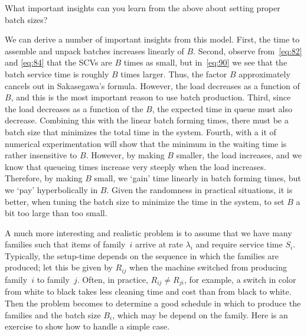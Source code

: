 \begin{exercise}
  What important insights can you learn from the above about setting proper batch sizes?
\begin{solution}
  We can derive a number of important insights from this model.
  First, the time to assemble and unpack batches increases linearly of $B$.
  Second, observe from~\cref{eq:82} and \cref{eq:84} that the SCVs are $B$ times as small, but in~\cref{eq:90} we see that the batch service time is roughly $B$ times larger.
  Thus, the factor $B$ approximately cancels out in Sakasegawa's formula.
  However, the load decreases as a function of $B$, and this is the most important reason to use batch production.
  Third, since the load decreases as a function of the $B$, the expected time in queue must also decrease.
  Combining this with the linear batch forming times, there must be a batch size that minimizes the total time in the system.
  Fourth, with a it of numerical experimentation will show that the minimum in the waiting time is rather insensitive to $B$.
  However, by making $B$ smaller, the load increases, and we know that queueing times increase very steeply when the load increases.
  Therefore, by making $B$ small, we `gain' time linearly in batch forming times, but we `pay' hyperbolically in $B$.
  Given the randomness in practical situations, it is better, when tuning the batch size to minimize the time in the system, to set $B$ a bit too large than too small.
\end{solution}
\end{exercise}

A much more interesting and realistic problem is to assume that we have many families such that items of family~$i$ arrive at rate $\lambda_i$ and require service time $S_i$.
Typically, the setup-time depends on the sequence in which the families are produced; let this be given by $R_{ij}$ when the machine switched from producing family~$i$ to family~$j$.
Often, in practice, $R_{ij} \neq R_{ji}$, for example, a switch in color from white to black takes less cleaning time and cost than from black to white.
Then the problem becomes to determine a good schedule in which to produce the families and the batch size $B_i$, which may be depend on the family.
Here is an exercise to show how to handle a simple case.

